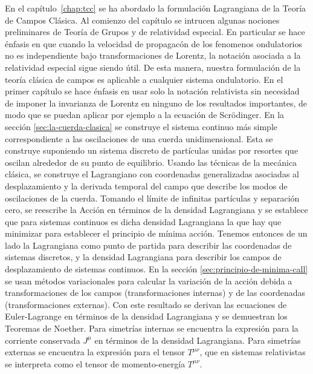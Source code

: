 En el capítulo~\ref{chap:tcc} se ha abordado la formulación
Lagrangiana de la Teoría de Campos Clásica.  Al comienzo del capítulo
se intrucen algunas nociones preliminares de Teoría de Grupos y de
relatividad especial. En particular se hace énfasis en que cuando la
velocidad de propagacón de los fenomenos ondulatorios no es
independiente bajo transformaciones de Lorentz, la notación asociada a
la relatividad especial sigue siendo útil. De esta manera, nuestra
formulación de la teoría clásica de campos es aplicable a cualquier
sistema ondulatorio. En el primer capítulo se hace énfasis en usar
solo la notación relativista sin necesidad de imponer la invarianza de
Lorentz en ninguno de los resultados importantes, de modo que se
puedan aplicar por ejemplo a la ecuación de Scrödinger.
%
%
En la sección \ref{sec:la-cuerda-clasica} se construye el sistema continuo más simple correspondiente a las oscilaciones de una cuerda unidimensional. Esta se construye suponiendo un sistema discreto de partículas unidas por resortes que oscilan alrededor de su punto de equilibrio. Usando las técnicas de la mecánica clásica, se construye el Lagrangiano con coordenadas generalizadas asociadas al desplazamiento y la derivada temporal del campo que describe los modos de oscilaciones de la cuerda. Tomando el límite de infinitas partículas y separación cero, se reescribe la Acción en términos de la densidad Lagrangiana y se establece que para sistemas continuos es dicha densidad Lagrangiana la que hay que minimizar para establecer el principio de mínima acción. Tenemos entonces de un lado la Lagrangiana como punto de partida para describir las coordenadas de sistemas discretos, y la densidad Lagrangiana para describir los campos de desplazamiento de sistemas continuos. 
%
En la sección \ref{sec:principio-de-minima-call} se usan métodos variacionales para calcular la variación de la acción debida a transformaciones de los campos (transformaciones internas) y de las coordenadas (transformaciones externas). Con este resultado se derivan las ecuaciones de Euler-Lagrange en términos de la densidad Lagrangiana y se demuestran los  Teoremas de Noether. Para simetrías internas se encuentra la expresión para la corriente conservada $J^\mu$ en términos de la densidad Lagrangiana. Para simetrías externas se encuentra la expresión para el tensor $T^{\mu\nu}$, que en sistemas relativistas se interpreta como el tensor de momento-energía $T^{\mu\nu}$. 

